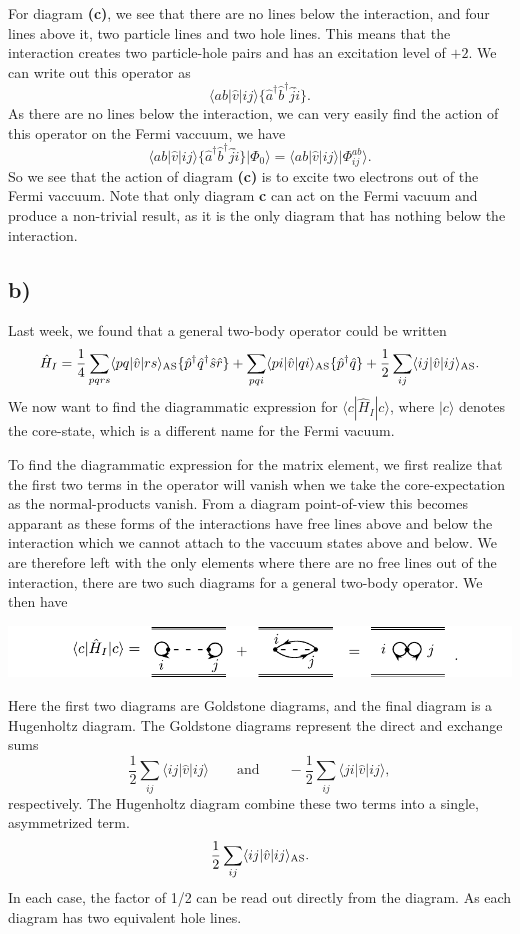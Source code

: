 \documentclass[a4paper, 11pt, notitlepage, english]{article}
\newcommand{\ket}[1]{|#1 \rangle}
\newcommand{\op}[1]{\hat{#1}}
\newcommand{\braopket}[3]{\langle #1 | {#2} | #3 \rangle}
\begin{document}
For diagram \textbf{(c)}, we see that there are no lines below the interaction, and four lines above it, two particle lines and two hole lines. This means that the interaction creates two particle-hole pairs and has an excitation level of $+2$. We can write out this operator as
$$\braopket{ab}{\op{v}}{ij}\{\op{a}^\dagger\op{b}^\dagger\op{j}\op{i}\}.$$
As there are no lines below the interaction, we can very easily find the action of this operator on the Fermi vaccuum, we have
$$\braopket{ab}{\op{v}}{ij}\{\op{a}^\dagger\op{b}^\dagger\op{j}\op{i}\} \ket{\Phi_0} = \braopket{ab}{\op{v}}{ij}\ket{\Phi_{ij}^{ab}}.$$
So we see that the action of diagram \textbf{(c)} is to excite two electrons out of the Fermi vaccuum. Note that only diagram \textbf{c} can act on the Fermi vacuum and produce a non-trivial result, as it is the only diagram that has nothing below the interaction.

\subsection*{b)}
Last week, we found that a general two-body operator could be written
$$\op{H}_I = \frac{1}{4}\sum_{pqrs}\braopket{pq}{\op{v}}{rs}_{\rm AS}\{\op{p}^\dagger \op{q}^\dagger\op{s}\op{r}\} + \sum_{pqi}\braopket{pi}{\op{v}}{qi}_{\rm AS}\{\op{p}^\dagger\op{q}\} + \frac{1}{2}\sum_{ij}\braopket{ij}{\op{v}}{ij}_{\rm AS}.$$
We now want to find the diagrammatic expression for $\braopket{c}{\op{H}_I}{c}$, where $\ket{c}$ denotes the core-state, which is a different name for the Fermi vacuum. 

To find the diagrammatic expression for the matrix element, we first realize that the first two terms in the operator will vanish when we take the core-expectation as the normal-products vanish. From a diagram point-of-view this becomes apparant as these forms of the interactions have free lines above and below the interaction which we cannot attach to the vaccuum states above and below. We are therefore left with the only elements where there are no free lines out of the interaction, there are two such diagrams for a general two-body operator. We then have
\begin{center}
	\includegraphics[width=\textwidth]{exercise9b}
\end{center}
Here the first two diagrams are Goldstone diagrams, and the final diagram is a Hugenholtz diagram. The Goldstone diagrams represent the direct and exchange sums
$$\frac{1}{2}\sum_{ij} \braopket{ij}{\op{v}}{ij} \qquad \mbox{and} \qquad -\frac{1}{2}\sum_{ij} \braopket{ji}{\op{v}}{ij},$$
respectively. The Hugenholtz diagram combine these two terms into a single, asymmetrized term.
$$\frac{1}{2}\sum_{ij} \braopket{ij}{\op{v}}{ij}_{\rm AS}.$$
In each case, the factor of 1/2 can be read out directly from the diagram. As each diagram has two equivalent hole lines.
\end{document}
